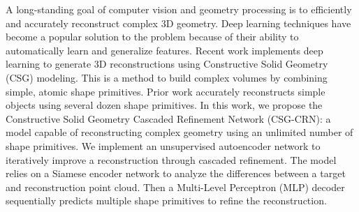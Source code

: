
A long-standing goal of computer vision and geometry processing is to efficiently and accurately reconstruct complex 3D geometry. Deep learning techniques have become a popular solution to the problem because of their ability to automatically learn and generalize features. Recent work implements deep learning to generate 3D reconstructions using Constructive Solid Geometry (CSG) modeling. This is a method to build complex volumes by combining simple, atomic shape primitives. Prior work accurately reconstructs simple objects using several dozen shape primitives. In this work, we propose the Constructive Solid Geometry Cascaded Refinement Network (CSG-CRN): a model capable of reconstructing complex geometry using an unlimited number of shape primitives. We implement an unsupervised autoencoder network to iteratively improve a reconstruction through cascaded refinement. The model relies on a Siamese encoder network to analyze the differences between a target and reconstruction point cloud. Then a Multi-Level Perceptron (MLP) decoder sequentially predicts multiple shape primitives to refine the reconstruction.

\vspace{2em}

